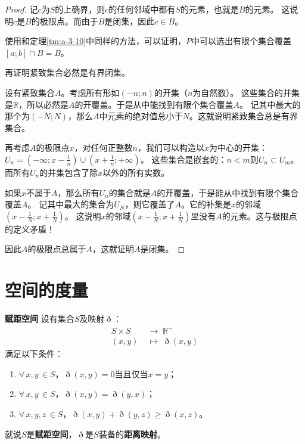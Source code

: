 \documentclass[12pt,UTF8]{ctexbook}
\begin{document}
\begin{appendix}
\begin{proof}
    记$c$为$S$的上确界，则$c$的任何邻域中都有$S$的元素，也就是$B$的元素。
    这说明$c$是$B$的极限点。而由于$B$是闭集，因此$c\in B$。

    使用和定理\ref{tm:a-3-10}中同样的方法，可以证明，$P$中可以选出有限个集合覆盖$[a;b]\cap B = B$。

    再证明紧致集合必然是有界闭集。

    设有紧致集合$A$。考虑所有形如$(-n;n)$的开集（$n$为自然数）。
    这些集合的并集是$\mathbb{R}$，所以必然是$A$的开覆盖。于是从中能找到有限个集合覆盖$A$。
    记其中最大的那个为$(-N;N)$，那么$A$中元素的绝对值总小于$N$。这就说明紧致集合总是有界集合。

    再考虑$A$的极限点$x$，对任何正整数$n$，我们可以构造以$x$为中心的开集：$\displaystyle U_n = \left(-\infty;x-\frac{1}{n}\right)\cup\left(x+\frac{1}{n};+\infty\right)$。
    这些集合是嵌套的：$n<m$则$U_n\subset U_m$。而所有$U_n$的并集包含了除$x$以外的所有实数。

    如果$x$不属于$A$，那么所有$U_n$的集合就是$A$的开覆盖，于是能从中找到有限个集合覆盖$A$。
    记其中最大的集合为$U_N$，则它覆盖了$A$。它的补集是$x$的邻域$\displaystyle\left(x-\frac{1}{N};x+\frac{1}{N}\right)$。
    这说明$x$的邻域$\displaystyle\left(x-\frac{1}{N};x+\frac{1}{N}\right)$里没有$A$的元素。这与极限点的定义矛盾！
    
    因此$A$的极限点总属于$A$，这就证明$A$是闭集。

\end{proof}

\chapter{空间的度量}

\begin{df}{\textbf{赋距空间}}
    设有集合$S$及映射$\eth$：
    \begin{align*}
        S\times S \;&\rightarrow \; \mathbb{R}^+ \\
        (x, y) \;&\mapsto \; \eth(x, y)
    \end{align*}
    满足以下条件：
    \begin{enumerate}
        \item $\forall \, x, y\, \in S$，$\eth(x, y) = 0$当且仅当$x = y$；
        \item $\forall \, x, y\, \in S$，$\eth(x, y) = \eth(y, x)$；
        \item $\forall \, x, y, z\, \in S$，$\eth(x, y) + \eth(y, z) \geqslant \eth (x, z)$。
    \end{enumerate}
    就说$S$是\textbf{赋距空间}，$\eth$是$S$装备的\textbf{距离映射}。
\end{df}


\end{appendix}
\end{document}
